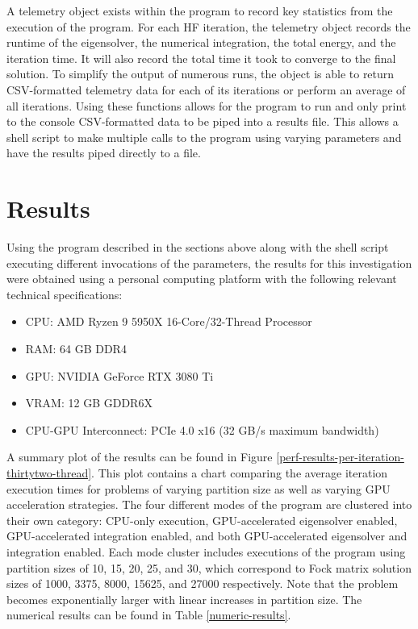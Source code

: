 \documentclass[conference, twoside]{IEEEtran}
\begin{document}
A telemetry object exists within the program to record key statistics from the execution of the program. For each HF iteration, the telemetry object records the runtime of the eigensolver, the numerical integration, the total energy, and the iteration time. It will also record the total time it took to converge to the final solution. To simplify the output of numerous runs, the object is able to return CSV-formatted telemetry data for each of its iterations or perform an average of all iterations. Using these functions allows for the program to run and only print to the console CSV-formatted data to be piped into a results file. This allows a shell script to make multiple calls to the program using varying parameters and have the results piped directly to a file.

\section{Results} %

Using the program described in the sections above along with the shell script executing different invocations of the parameters, the results for this investigation were obtained using a personal computing platform with the following relevant technical specifications:

\begin{itemize}
    \item CPU: AMD Ryzen 9 5950X 16-Core/32-Thread Processor
    \item RAM: 64 GB DDR4
    \item GPU: NVIDIA GeForce RTX 3080 Ti
    \item VRAM: 12 GB GDDR6X 
    \item CPU-GPU Interconnect: PCIe 4.0 x16 (32 GB/s maximum bandwidth)
\end{itemize}

A summary plot of the results can be found in Figure \ref{perf-results-per-iteration-thirtytwo-thread}. This plot contains a chart comparing the average iteration execution times for problems of varying partition size as well as varying GPU acceleration strategies. The four different modes of the program are clustered into their own category: CPU-only execution, GPU-accelerated eigensolver enabled, GPU-accelerated integration enabled, and both GPU-accelerated eigensolver and integration enabled. Each mode cluster includes executions of the program using partition sizes of 10, 15, 20, 25, and 30, which correspond to Fock matrix solution sizes of 1000, 3375, 8000, 15625, and 27000 respectively. Note that the problem becomes exponentially larger with linear increases in partition size. The numerical results can be found in Table \ref{numeric-results}.
\end{document}
